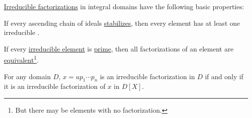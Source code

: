 \begin{proposition}\label{thm:def:irreducible_factorization}
  \hyperref[def:irreducible_factorization]{Irreducible factorizations} in integral domains have the following basic properties:
  \begin{thmenum}
     If every ascending chain of  ideals \hyperref[def:stabilizing_chain]{stabilizes}, then every element has at least one irreducible .

     If every \hyperref[def:domain_divisibility/irreducible]{irreducible element} is \hyperref[def:domain_divisibility/prime]{prime}, then all factorizations of an element are \hyperref[def:irreducible_factorization/equivalent]{equivalent}\footnote{But there may be elements with no factorization.}.

     For any domain \( D \), \( x = u p_1 \cdots p_n \) is an irreducible factorization in \( D \) if and only if it is an irreducible factorization of \( x \) in \( D[X] \).
  \end{thmenum}
\end{proposition}
